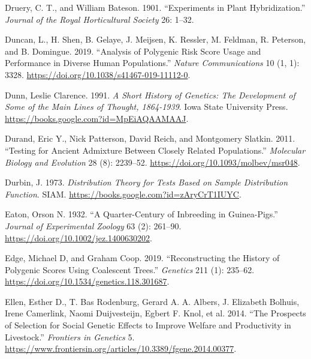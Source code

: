 \documentclass[
]{book}
\newlength{\cslhangindent}
\newlength{\cslentryspacingunit} %
\newenvironment{CSLReferences}[2] %
 {%
  \setlength{\parindent}{0pt}
  \ifodd #1
  \let\oldpar\par
  \def\par{\hangindent=\cslhangindent\oldpar}
  \fi
  \setlength{\parskip}{#2\cslentryspacingunit}
 }%
 {}
\begin{document}
\begin{CSLReferences}{1}{0}
\leavevmode{}%
Druery, C. T., and William Bateson. 1901. {``Experiments in Plant Hybridization.''} \emph{Journal of the Royal Horticultural Society} 26: 1--32.

\leavevmode{}%
Duncan, L., H. Shen, B. Gelaye, J. Meijsen, K. Ressler, M. Feldman, R. Peterson, and B. Domingue. 2019. {``Analysis of Polygenic Risk Score Usage and Performance in Diverse Human Populations.''} \emph{Nature Communications} 10 (1, 1): 3328. \url{https://doi.org/10.1038/s41467-019-11112-0}.

\leavevmode{}%
Dunn, Leslie Clarence. 1991. \emph{A {Short History} of {Genetics}: {The Development} of {Some} of the {Main Lines} of {Thought}, 1864-1939}. {Iowa State University Press}. \url{https://books.google.com?id=MpEiAQAAMAAJ}.

\leavevmode{}%
Durand, Eric Y., Nick Patterson, David Reich, and Montgomery Slatkin. 2011. {``Testing for {Ancient Admixture} Between {Closely Related Populations}.''} \emph{Molecular Biology and Evolution} 28 (8): 2239--52. \url{https://doi.org/10.1093/molbev/msr048}.

\leavevmode{}%
Durbin, J. 1973. \emph{Distribution {Theory} for {Tests Based} on {Sample Distribution Function}}. {SIAM}. \url{https://books.google.com?id=zAryCrT1IUYC}.

\leavevmode{}%
Eaton, Orson N. 1932. {``A Quarter-Century of Inbreeding in Guinea-Pigs.''} \emph{Journal of Experimental Zoology} 63 (2): 261--90. \url{https://doi.org/10.1002/jez.1400630202}.

\leavevmode{}%
Edge, Michael D, and Graham Coop. 2019. {``Reconstructing the {History} of {Polygenic Scores Using Coalescent Trees}.''} \emph{Genetics} 211 (1): 235--62. \url{https://doi.org/10.1534/genetics.118.301687}.

\leavevmode{}%
Ellen, Esther D., T. Bas Rodenburg, Gerard A. A. Albers, J. Elizabeth Bolhuis, Irene Camerlink, Naomi Duijvesteijn, Egbert F. Knol, et al. 2014. {``The Prospects of Selection for Social Genetic Effects to Improve Welfare and Productivity in Livestock.''} \emph{Frontiers in Genetics} 5. \url{https://www.frontiersin.org/articles/10.3389/fgene.2014.00377}.


\end{CSLReferences}
\end{document}
